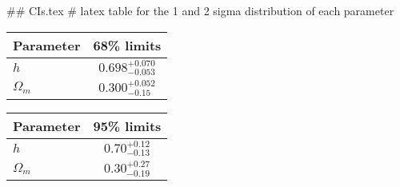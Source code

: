 ## CIs.tex
# latex table for the 1 and 2 sigma distribution of each parameter

\begin{tabular} { l  c}
 Parameter &  68\% limits\\
\hline
{\boldmath$h              $} & $0.698^{+0.070}_{-0.053}   $\\
{\boldmath$\Omega_m       $} & $0.300^{+0.052}_{-0.15}    $\\
\hline
\end{tabular}

\begin{tabular} { l  c}
 Parameter &  95\% limits\\
\hline
{\boldmath$h              $} & $0.70^{+0.12}_{-0.13}      $\\
{\boldmath$\Omega_m       $} & $0.30^{+0.27}_{-0.19}      $\\
\hline
\end{tabular}
